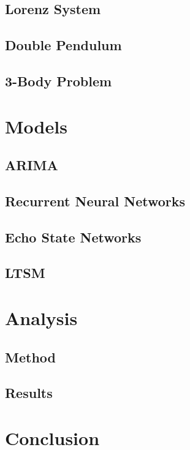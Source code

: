 \documentclass{article}
\begin{document}
\subsection{Lorenz System}
\subsection{Double Pendulum}
\subsection{3-Body Problem}

\section{Models}

\subsection{ARIMA}
\subsection{Recurrent Neural Networks}
\subsection{Echo State Networks}
\subsection{LTSM}

\section{Analysis}

\subsection{Method}
\subsection{Results}

\section{Conclusion}



\end{document}
